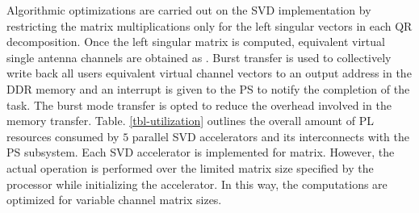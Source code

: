\documentclass[conference,letterpaper,10pt]{./../../IEEE/IEEEtran}
\begin{document}
Algorithmic optimizations are carried out on the SVD implementation by restricting the matrix multiplications only for the left singular vectors in each QR decomposition. Once the left singular matrix is computed, equivalent virtual single antenna channels are obtained as . Burst transfer is used to collectively write back all users equivalent virtual channel vectors to an output address in the DDR memory and an interrupt is given to the PS to notify the completion of the task. The burst mode transfer is opted to reduce the overhead involved in the memory transfer. Table. \ref{tbl-utilization} outlines the overall amount of PL resources consumed by $5$ parallel SVD accelerators and its interconnects with the PS subsystem. Each SVD accelerator is implemented for  matrix. However, the actual operation is performed over the limited matrix size specified by the processor while initializing the accelerator. In this way, the computations are optimized for variable channel matrix sizes.
\end{document}
